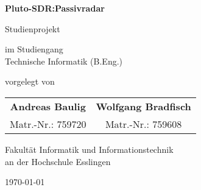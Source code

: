 \begin{titlepage}
    \begin{center}
        \vspace*{1cm}
        {\Huge \textbf{Pluto-SDR:\@ Passivradar}}

        \vspace{0.5cm}

        {\Large Studienprojekt}

        \vspace{1cm}

        

        \vspace{1cm}

        \large
        im Studiengang \\
        \Large
        Technische Informatik (B.Eng.)

        \vspace{1cm}

        \large
        vorgelegt von

        \vspace{0.25cm}

        \Large
        \begin{tabular}{c c}
            \textbf{Andreas Baulig} & \textbf{Wolfgang Bradfisch} \\
            Matr.-Nr.: 759720       & Matr.-Nr.: 759608           \\
        \end{tabular}

        \vspace{0.5cm}

        Fakultät Informatik und Informationstechnik \\
        an der Hochschule Esslingen

        \vfill

        \today

    \end{center}
\end{titlepage}
